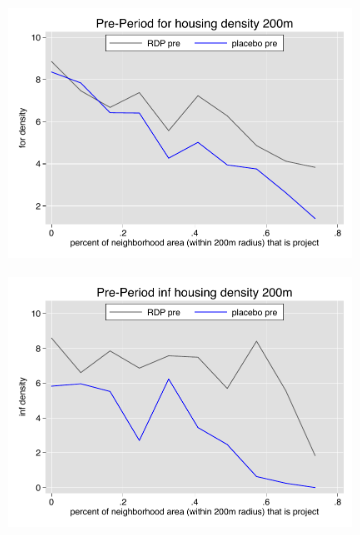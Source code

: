 \documentclass[12pt]{article}
\begin{document}
\begin{figure}
        \begin{subfigure}[b]{0.495\textwidth}
            \centering
            \includegraphics[width=\textwidth,trim={0.3cm .3cm 0.1cm 0cm}, clip=true]{figures/overlap_for_200_local_pre.pdf}
        \end{subfigure}
        \hfill
        \begin{subfigure}[b]{0.495\textwidth}  
            \centering 
            \includegraphics[width=\textwidth,trim={0.3cm .3cm 0.1cm 0cm}, clip=true]{figures/overlap_inf_200_local_pre.pdf}
        \end{subfigure}
        \vspace{-6mm}

\end{figure}
\end{document}
